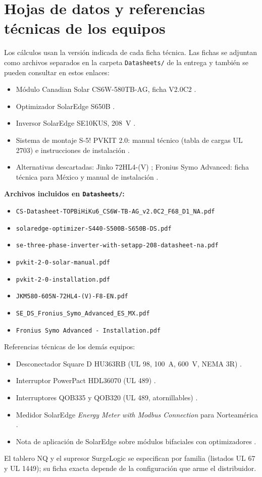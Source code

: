 \documentclass[12pt]{article}
\begin{document}
\section{Hojas de datos y referencias técnicas de los equipos}
Los cálculos usan la versión indicada de cada ficha técnica. Las fichas se adjuntan como archivos separados en la carpeta \texttt{Datasheets/} de la entrega y también se pueden consultar en estos enlaces:
\begin{itemize}
\item Módulo Canadian Solar CS6W-580TB-AG, ficha V2.0C2 \cite{csDatasheet}.
\item Optimizador SolarEdge S650B \cite{seOpt}.
\item Inversor SolarEdge SE10KUS, 208~V \cite{seInv}.
\item Sistema de montaje S-5! PVKIT 2.0: manual técnico (tabla de cargas UL 2703) e instrucciones de instalación \cite{s5manual,s5inst}.
\item Alternativas descartadas: Jinko 72HL4-(V) \cite{jinkoV}; Fronius Symo Advanced: ficha técnica para México y manual de instalación \cite{fronius,fronius480,froniusMX,froniusUL3741}.
\end{itemize}

\textbf{Archivos incluidos en \texttt{Datasheets/}:}
\begin{itemize}[itemsep=0pt]
\item \nolinkurl{CS-Datasheet-TOPBiHiKu6_CS6W-TB-AG_v2.0C2_F68_D1_NA.pdf}
\item \nolinkurl{solaredge-optimizer-S440-S500B-S650B-DS.pdf}
\item \nolinkurl{se-three-phase-inverter-with-setapp-208-datasheet-na.pdf}
\item \nolinkurl{pvkit-2-0-solar-manual.pdf}
\item \nolinkurl{pvkit-2-0-installation.pdf}
\item \nolinkurl{JKM580-605N-72HL4-(V)-F8-EN.pdf}
\item \nolinkurl{SE_DS_Fronius_Symo_Advanced_ES_MX.pdf}
\item \texttt{Fronius Symo Advanced - Installation.pdf}
\end{itemize}

Referencias técnicas de los demás equipos:
\begin{itemize}
\item Desconectador Square D HU363RB (UL 98, 100~A, 600~V, NEMA 3R) \cite{seHU363RB}.
\item Interruptor PowerPact HDL36070 (UL 489) \cite{seHDL}.
\item Interruptores QOB335 y QOB320 (UL 489, atornillables) \cite{seQOB}.
\item Medidor SolarEdge \emph{Energy Meter with Modbus Connection} para Norteamérica \cite{seMeter}.
\item Nota de aplicación de SolarEdge sobre módulos bifaciales con optimizadores \cite{seBifacial}.
\end{itemize}
El tablero NQ y el supresor SurgeLogic se especifican por familia (listados UL 67 y UL 1449); su ficha exacta depende de la configuración que arme el distribuidor.
\end{document}
